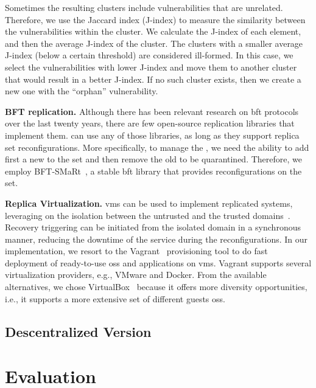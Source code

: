 Sometimes the resulting clusters include vulnerabilities that are unrelated. Therefore, we use the Jaccard index (J-index) to measure the similarity between the vulnerabilities within the cluster. We calculate the J-index of each element, and then the average J-index of the cluster. 
The clusters with a smaller average J-index (below a certain threshold) are considered ill-formed. In this case, we select the vulnerabilities with lower J-index and move them to another cluster that would result in a better J-index. If no such cluster exists, then we create a new one with the ``orphan'' vulnerability.

\textbf{BFT replication.}
Although there has been relevant research on \gls{bft} protocols over the last twenty years, there are few open-source replication libraries that implement them. \system can use any of those libraries, as long as they support replica set reconfigurations.
More specifically, to manage the \replicas, we need the ability to add first a new \replica to the set and then remove the old \replica to be quarantined. 
Therefore, we employ BFT-SMaRt~\cite{Bessani:2014}, a stable \gls{bft} library that provides reconfigurations on the \replicas set.

\textbf{Replica Virtualization.}
\glspl{vm} can be used to implement replicated systems, leveraging on the isolation between the untrusted and the trusted domains~\cite{Sousa:2010,Platania:2014,Distler:2011,Dettoni:2013}.
Recovery triggering can be initiated from the isolated domain in a synchronous manner, reducing the downtime of the service during the reconfigurations. 
In our implementation, we resort to the Vagrant~\cite{vagrant} provisioning tool to do fast deployment of ready-to-use \glspl{os} and applications on \glspl{vm}. 
Vagrant supports several virtualization providers, e.g., VMware and Docker. 
From the available alternatives, we chose VirtualBox~\cite{virtualbox} because it offers more diversity opportunities, i.e., it supports a more extensive set of different guests \glspl{os}.

\subsection{Descentralized \system Version}

\section{Evaluation}
\label{sec:overhead}

